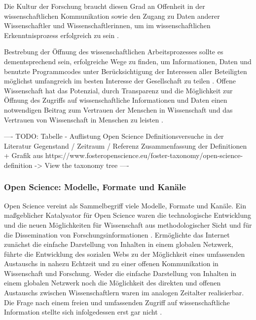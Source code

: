 Die Kultur der Forschung braucht diesen Grad an Offenheit in der wissenschaftlichen Kommunikation sowie den Zugang zu Daten anderer Wissenschaftler und Wissenschaftlerinnen, um im wissenschaftlichen Erkenntnisprozess erfolgreich zu sein \cite{Fecher_2015} \cite{Krumholz_2014} \cite{patlak_2010_open}.

Bestrebung der Öffnung des wissenschaftlichen Arbeitsprozesses sollte es dementsprechend sein, erfolgreiche Wege zu finden, um Informationen, Daten und benutzte Programmcodes unter Berücksichtigung der Interessen aller Beteiligten möglichst umfangreich im besten Interesse der Gesellschaft zu teilen \cite{naeder_2010_open} \cite{Ross_2013} \cite{hey_2015_open}. Offene Wissenschaft hat das Potenzial, durch Transparenz und die Möglichkeit zur Öffnung des Zugriffs auf wissenschaftliche Informationen und Daten einen notwendigen Beitrag zum Vertrauen der Menschen in Wissenschaft und das Vertrauen von Wissenschaft in Menschen zu leisten \cite{grand_2012_open}.

---- TODO: Tabelle - Auflistung Open Science Definitionsversuche in der Literatur Gegenstand / Zeitraum / Referenz Zusammenfassung der Definitionen + Grafik aus https://www.fosteropenscience.eu/foster-taxonomy/open-science-definition -> View the taxonomy tree ----

\subsubsection{Open Science: Modelle, Formate und Kanäle}

Open Science vereint als Sammelbegriff viele Modelle, Formate und Kanäle. Ein maßgeblicher Katalysator für Open Science waren die technologische Entwicklung und die neuen Möglichkeiten für Wissenschaft aus methodologischer Sicht und für die Dissemination von Forschungsinformationen \cite{garcia_2010_open}. Ermöglichte das Internet zunächst die einfache Darstellung von Inhalten in einem globalen Netzwerk, führte die Entwicklung des sozialen Webs zu der Möglichkeit eines umfassenden Austauschs in nahezu Echtzeit und zu einer offenen Kommunikation in Wissenschaft und Forschung. Weder die einfache Darstellung von Inhalten in einem globalen Netzwerk noch die Möglichkeit des direkten und offenen Austauschs zwischen Wissenschaftlern waren im analogen Zeitalter realisierbar. Die Frage nach einem freien und umfassenden Zugriff auf wissenschaftliche Information stellte sich infolgedessen erst gar nicht \cite{Schirmbacher_oa_2007}.

